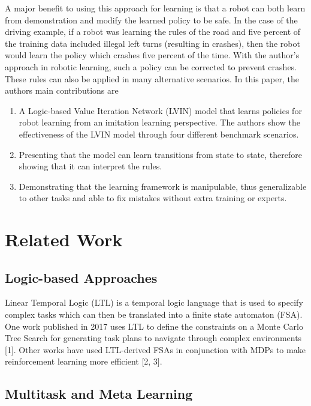 \documentclass[letterpaper, 10 pt, conference]{ieeeconf}  %
\begin{document}
\newline
\indent A major benefit to using this approach for learning is that a robot can both learn from demonstration and modify the learned policy to be safe. In the case of the driving example, if a robot was learning the rules of the road and five percent of the training data included illegal left turns (resulting in crashes), then the robot would learn the policy which crashes five percent of the time. With the author's approach in robotic learning, such a policy can be corrected to prevent crashes. These rules can also be applied in many alternative scenarios.
\newline
\indent In this paper, the authors main contributions are
\begin{enumerate}
  \item A Logic-based Value Iteration Network (LVIN) model that learns policies for robot learning from an imitation learning perspective. The authors show the effectiveness of the LVIN model through four different benchmark scenarios.
  \item Presenting that the model can learn transitions from state to state, therefore showing that it can interpret the rules.
  \item Demonstrating that the learning framework is manipulable, thus generalizable to other tasks and able to fix mistakes without extra training or experts.
\end{enumerate}

\section{Related Work}

\subsection{Logic-based Approaches}

Linear Temporal Logic (LTL) is a temporal logic language that is used to specify complex tasks which can then be translated into a finite state automaton (FSA). One work published in 2017 uses LTL to define the constraints on a Monte Carlo Tree Search for generating task plans to navigate through complex environments [1]. Other works have used LTL-derived FSAs in conjunction with MDPs to make reinforcement learning more efficient [2, 3].

\subsection{Multitask and Meta Learning}
\end{document}
